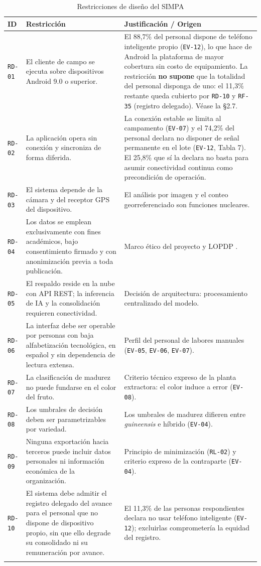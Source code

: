 \documentclass[11pt,a4paper]{article}
\newcommand{\id}[1]{\texttt{\begingroup\hyphenpenalty=10000\relax#1\endgroup}}
\renewcommand{\id}[1]{\texttt{#1}}
\begin{document}
\begin{longtable}{|C{1.5cm}|L{6.8cm}|L{6.6cm}|}
\hline
{}\textbf{ID} & \textbf{Restricción} & \textbf{Justificación / Origen} \\
\hline
\endhead
\id{RD-01} & El cliente de campo se ejecuta sobre dispositivos Android 9.0 o superior. & El 88,7\% del personal dispone de teléfono inteligente propio (\id{EV-12}), lo que hace de Android la plataforma de mayor cobertura sin costo de equipamiento. La restricción \textbf{no supone} que la totalidad del personal disponga de uno: el 11,3\% restante queda cubierto por \id{RD-10} y \id{RF-35} (registro delegado). Véase la §2.7. \\ \hline
\id{RD-02} & La aplicación opera sin conexión y sincroniza de forma diferida. & La conexión estable se limita al campamento (\id{EV-07}) y el 74,2\% del personal declara no disponer de señal permanente en el lote (\id{EV-12}, Tabla 7). El 25,8\% que sí la declara no basta para asumir conectividad continua como precondición de operación. \\ \hline
\id{RD-03} & El sistema depende de la cámara y del receptor GPS del dispositivo. & El análisis por imagen y el conteo georreferenciado son funciones nucleares. \\ \hline
\id{RD-04} & Los datos se emplean exclusivamente con fines académicos, bajo consentimiento firmado y con anonimización previa a toda publicación. & Marco ético del proyecto y LOPDP \cite{lopdp}. \\ \hline
\id{RD-05} & El respaldo reside en la nube con API REST; la inferencia de IA y la consolidación requieren conectividad. & Decisión de arquitectura: procesamiento centralizado del modelo. \\ \hline
\id{RD-06} & La interfaz debe ser operable por personas con baja alfabetización tecnológica, en español y sin dependencia de lectura extensa. & Perfil del personal de labores manuales (\id{EV-05}, \id{EV-06}, \id{EV-07}). \\ \hline
\id{RD-07} & La clasificación de madurez no puede fundarse en el color del fruto. & Criterio técnico expreso de la planta extractora: el color induce a error (\id{EV-08}). \\ \hline
\id{RD-08} & Los umbrales de decisión deben ser parametrizables por variedad. & Los umbrales de madurez difieren entre \emph{guineensis} e híbrido (\id{EV-04}). \\ \hline
\id{RD-09} & Ninguna exportación hacia terceros puede incluir datos personales ni información económica de la organización. & Principio de minimización (\id{RL-02}) y criterio expreso de la contraparte (\id{EV-04}). \\ \hline
\id{RD-10} & El sistema debe admitir el registro delegado del avance para el personal que no dispone de dispositivo propio, sin que ello degrade su consolidado ni su remuneración por avance. & El 11{,}3\% de las personas respondientes declara no usar teléfono inteligente (\id{EV-12}); excluirlas comprometería la equidad del registro. \\ \hline
\caption{Restricciones de diseño del SIMPA}
\end{longtable}
\end{document}
